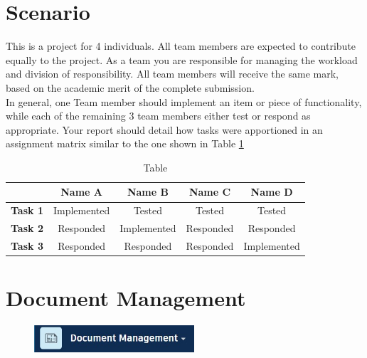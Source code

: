 \section*{Scenario}



This is a project for 4 individuals. All team members are expected to contribute equally to the project. As a team you are responsible for managing the workload and division of responsibility. All team members will receive the same mark, based on the academic merit of the complete submission.\\


In general, one Team member should implement an item or piece of functionality, while each of the remaining 3 team members either test or respond as appropriate.  Your report should detail how tasks were apportioned in an assignment matrix similar to the one shown in Table \ref{tab:AM}

\begin{table}[ht]
	\centering
	\begin{tabular}{|l|c|c|c|c|}
		\hline
		& \textbf{Name A} & \textbf{Name B} & \textbf{Name C} & \textbf{Name D} \\
		\hline
		\textbf{Task 1} & Implemented & Tested & Tested & Tested \\
		\hline
		\textbf{Task 2} & Responded & Implemented & Responded & Responded \\
		\hline
		\textbf{Task 3} & Responded & Responded & Responded & Implemented \\
		\hline
	
	\end{tabular}
	\caption{Table }
	\label{tab:AM}
\end{table}







\section{Document Management}

\begin{figure}[h!t]
	\includegraphics[height=1.0cm]{RevitAssets/docmgmt}
	\label{fig:docmgmt}
\end{figure}





